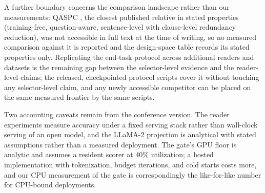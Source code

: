 \documentclass[preprint,12pt]{elsarticle}
\theoremstyle{remark}
\begin{document}
A further boundary concerns the comparison landscape rather than our
measurements: QASPC \citep{chen2025qaspc}, the closest published
relative in stated properties (training-free, question-aware,
sentence-level with clause-level redundancy reduction), was not
accessible in full text at the time of writing, so no measured
comparison against it is reported and the design-space table records
its stated properties only. Replicating the end-task protocol across
additional readers and datasets is the remaining gap between the
selector-level evidence and the reader-level claims; the released,
checkpointed protocol scripts cover it without touching any
selector-level claim, and any newly accessible competitor can be
placed on the same measured frontier by the same scripts.

Two accounting caveats remain from the conference version. The reader
experiments measure accuracy under a fixed serving stack rather than
wall-clock serving of an open model, and the LLaMA-2 projection is
analytical with stated assumptions rather than a measured deployment.
The gate's GPU floor is analytic and assumes a resident scorer at 40\%
utilization; a hosted implementation with tokenization, budget
iterations, and cold starts costs more, and our CPU measurement of
the gate is correspondingly the like-for-like number for CPU-bound
deployments.
\end{document}
